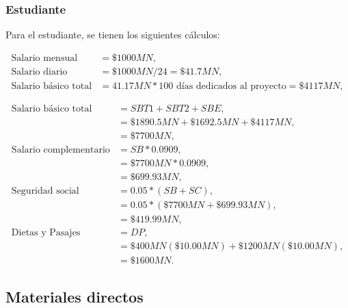 \subsubsection{Estudiante}

Para el estudiante, se tienen los siguientes cálculos:

\begin{align}
    \label{eq:student_salary}
    \text{Salario mensual}      & = \$1000MN,                                                     \\
    \text{Salario diario}       & = \$1000MN / 24= \$41.7MN,                                      \\
    \text{Salario básico total} & = 41.17 MN * 100 \text{ días dedicados al proyecto} = \$4117MN,
\end{align}

\begin{align}
    \label{eq:additional_calculations}
    \text{Salario básico total}   & = SBT1 + SBT2 + SBE,                            \\
                                  & = \$1890.5MN + \$1692.5MN+ \$4117MN,            \\
                                  & = \$7700MN,                                     \\
    \text{Salario complementario} & = SB * 0.0909,                                  \\
                                  & = \$7700MN * 0.0909,                            \\
                                  & = \$699.93MN,                                   \\
    \text{Seguridad social}       & = 0.05 * (SB + SC),                             \\
                                  & = 0.05 * (\$7700MN + \$699.93MN),               \\
                                  & = \$419.99MN,                                   \\
    \text{Dietas y Pasajes}       & = DP,                                           \\
                                  & = \$400MN (\$10.00MN ) + \$1200MN (\$10.00MN ), \\
                                  & = \$1600MN.
\end{align}


\subsection{Materiales directos}

